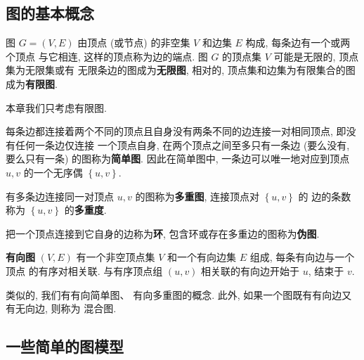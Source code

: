 \documentclass[10pt,UTF8]{book} %
\begin{document}
\subsection{图的基本概念}

\begin{definition}
    图 $G = (V, E)$ 由顶点 (或节点) 的非空集 $V$ 和边集 $E$ 构成, 每条边有一个或两个顶点
    与它相连, 这样的顶点称为边的端点.
    图 $G$ 的顶点集 $V$ 可能是无限的, 顶点集为无限集或有
    无限条边的图成为\textbf{无限图}, 相对的, 顶点集和边集为有限集合的图成为\textbf{有限图}.
\end{definition}

本章我们只考虑有限图.

每条边都连接着两个不同的顶点且自身没有两条不同的边连接一对相同顶点, 即没有任何一条边仅连接
一个顶点自身, 在两个顶点之间至多只有一条边 (要么没有, 要么只有一条) 的图称为\textbf{简单图}.
因此在简单图中, 一条边可以唯一地对应到顶点 $u, v$ 的一个无序偶 $\left\{ u, v \right\}$.

有多条边连接同一对顶点 $u, v$ 的图称为\textbf{多重图}, 连接顶点对 $\left\{ u, v \right\}$ 的
边的条数称为 $\left\{ u, v \right\}$ 的\textbf{多重度}.

把一个顶点连接到它自身的边称为\textbf{环}, 包含环或存在多重边的图称为\textbf{伪图}.

\begin{definition}
    \textbf{有向图} $(V, E)$ 有一个非空顶点集 $V$ 和一个有向边集 $E$ 组成, 每条有向边与一个顶点
    的有序对相关联. 与有序顶点组 $(u, v)$ 相关联的有向边开始于 $u$, 结束于 $v$.
\end{definition}

类似的, 我们有有向简单图、 有向多重图的概念. 此外, 如果一个图既有有向边又有无向边, 则称为
混合图.

\subsection{一些简单的图模型}
\end{document}

